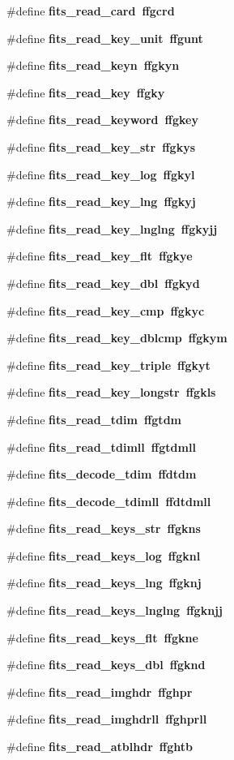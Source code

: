 \begin{CompactItemize}
\#define \bf{fits\_\-read\_\-card}~ffgcrd
\item 
\#define \bf{fits\_\-read\_\-key\_\-unit}~ffgunt
\item 
\#define \bf{fits\_\-read\_\-keyn}~ffgkyn
\item 
\#define \bf{fits\_\-read\_\-key}~ffgky
\item 
\#define \bf{fits\_\-read\_\-keyword}~ffgkey
\item 
\#define \bf{fits\_\-read\_\-key\_\-str}~ffgkys
\item 
\#define \bf{fits\_\-read\_\-key\_\-log}~ffgkyl
\item 
\#define \bf{fits\_\-read\_\-key\_\-lng}~ffgkyj
\item 
\#define \bf{fits\_\-read\_\-key\_\-lnglng}~ffgkyjj
\item 
\#define \bf{fits\_\-read\_\-key\_\-flt}~ffgkye
\item 
\#define \bf{fits\_\-read\_\-key\_\-dbl}~ffgkyd
\item 
\#define \bf{fits\_\-read\_\-key\_\-cmp}~ffgkyc
\item 
\#define \bf{fits\_\-read\_\-key\_\-dblcmp}~ffgkym
\item 
\#define \bf{fits\_\-read\_\-key\_\-triple}~ffgkyt
\item 
\#define \bf{fits\_\-read\_\-key\_\-longstr}~ffgkls
\item 
\#define \bf{fits\_\-read\_\-tdim}~ffgtdm
\item 
\#define \bf{fits\_\-read\_\-tdimll}~ffgtdmll
\item 
\#define \bf{fits\_\-decode\_\-tdim}~ffdtdm
\item 
\#define \bf{fits\_\-decode\_\-tdimll}~ffdtdmll
\item 
\#define \bf{fits\_\-read\_\-keys\_\-str}~ffgkns
\item 
\#define \bf{fits\_\-read\_\-keys\_\-log}~ffgknl
\item 
\#define \bf{fits\_\-read\_\-keys\_\-lng}~ffgknj
\item 
\#define \bf{fits\_\-read\_\-keys\_\-lnglng}~ffgknjj
\item 
\#define \bf{fits\_\-read\_\-keys\_\-flt}~ffgkne
\item 
\#define \bf{fits\_\-read\_\-keys\_\-dbl}~ffgknd
\item 
\#define \bf{fits\_\-read\_\-imghdr}~ffghpr
\item 
\#define \bf{fits\_\-read\_\-imghdrll}~ffghprll
\item 
\#define \bf{fits\_\-read\_\-atblhdr}~ffghtb
\item 

\end{CompactItemize}

